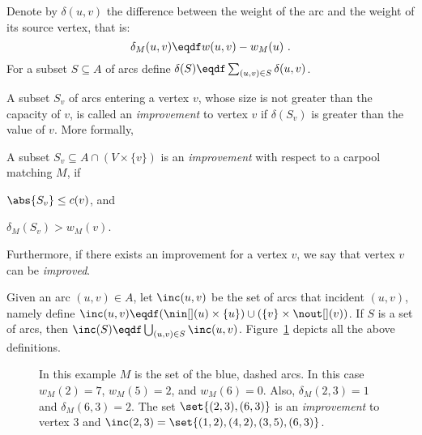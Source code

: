 Denote by $\delta(u,v)$ the difference between the weight of the arc
and the weight of its source vertex, that is:
\[
\delta_M(u, v) \eqdf w(u, v) - w_M(u)
~.
\]
For a subset $S \subseteq A$ of arcs define
$\delta(S) \eqdf \sum_{(u,v) \in S} \delta(u,v)$.

A subset $S_v$ of arcs entering a vertex $v$, whose size is not
greater than the capacity of $v$, is called an \emph{improvement} to
vertex $v$ if $\delta(S_v)$ is greater than the value of $v$.  More
formally, 

\begin{definition}
A subset $S_v \subseteq A \cap (V \times \{v\})$ is
an \emph{improvement} with respect to a carpool matching $M$, if%
\begin{inparaenum}[(i)]
\item $\abs{S_v} \leq c(v)$, and
\item $\delta_M(S_v) > w_M(v)$.
\end{inparaenum}
Furthermore, if there exists an improvement for a vertex $v$, we say
that vertex $v$ can be \emph{improved}.
\end{definition}

Given an arc $(u,v) \in A$, let $\inc(u,v)$ be the set of arcs that
incident $(u, v)$, namely define
\(
\inc(u,v) \eqdf (\nin[](u) \times \{u\}) \cup (\{v\} \times \nout[](v))
\).
If $S$ is a set of arcs, then $\inc(S) \eqdf \bigcup_{(u,v) \in
S} \inc(u,v)$.
%
Figure~\ref{fig:defs} depicts all the above definitions.

\begin{figure}
\centering
{}
\caption[Carpool - Local Search Improvement]{In this example $M$ is the set of the blue, dashed arcs.
In this case $w_M(2) = 7$, $w_M(5) = 2$, and $w_M(6) = 0$.  Also,
$\delta_M(2, 3) = 1$ and $\delta_M(6, 3) = 2$.  The set $\set{(2,3),
(6,3)}$ is an \emph{improvement} to vertex 3 and $\inc(2,3)
= \set{(1,2),(4,2),(3,5),(6,3)}$.}
\label{fig:defs}
\end{figure}

